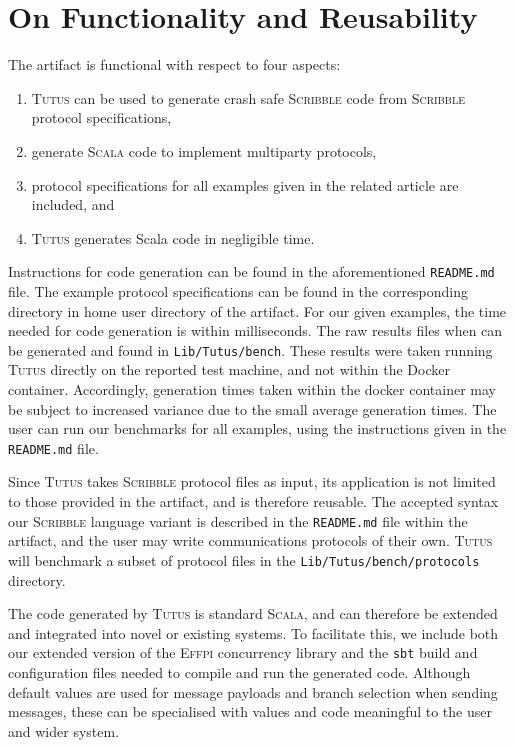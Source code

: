\documentclass[a4paper,UKenglish]{darts-v2021}
\newcommand{\Scribble}[0]{\textsc{Scribble}\xspace}
\newcommand{\Effpi}[0]{\textsc{Effpi}\xspace}
\newcommand{\newTool}[0]{\textsc{Tutus}\xspace}
\newcommand{\Scala}[0]{\textsc{Scala}\xspace}
\begin{document}
\section{On Functionality and Reusability}
% 
The artifact is functional with respect to four aspects:
% 
\begin{enumerate}
\item \label{it:f1} \newTool can be used to generate crash safe \Scribble code from \Scribble protocol specifications,
\item \label{it:f1} generate \Scala code to implement multiparty protocols,
\item \label{it:f2} protocol specifications for all examples given in the related article are included, and
\item \label{it:f3} \newTool generates Scala code in negligible time.
\end{enumerate}
% 
Instructions for code generation can be found in the aforementioned
\texttt{README.md} file. The example protocol specifications can be found in the
corresponding directory in home user directory of the artifact.
% 
For our given examples, the time needed for code generation is within
milliseconds. The raw results files when can be generated and found in 
\texttt{Lib/Tutus/bench}. These results were
taken running \newTool directly on the reported test machine, and not within the
Docker container. Accordingly, generation times taken within the docker
container may be subject to increased variance due to the small average
generation times. The user can run our benchmarks for all examples, using the
instructions given in the \texttt{README.md} file.

Since \newTool takes \Scribble protocol files as input, its application is not
limited to those provided in the artifact, and is therefore reusable. The
accepted syntax our \Scribble language variant is described in the
\texttt{README.md} file within the artifact, and the user may write
communications protocols of their own.
% 
\newTool will benchmark a subset of protocol files in the
\texttt{Lib/Tutus/bench/protocols} directory. 

The code generated by \newTool is standard \Scala, and can therefore be extended and integrated into novel or existing systems.
% 
To facilitate this, we include both our extended version of the \Effpi
concurrency library and the \texttt{sbt} build and configuration files needed to
compile and run the generated code. Although default values are used for message
payloads and branch selection when sending messages, these can be specialised
with values and code meaningful to the user and wider system.







\end{document}

